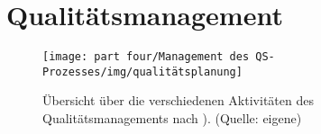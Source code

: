 \section{Qualitätsmanagement}

\begin{figure}
    \centering
    \texttt{[image: part four/Management des QS-Prozesses/img/qualitätsplanung]}
    \caption{Übersicht über die verschiedenen Aktivitäten des Qualitätsmanagements nach \cite[479 ff.]{Bal08}). (Quelle: eigene)}
    \label{fig:qualitätsplanung-cc}
\end{figure}
